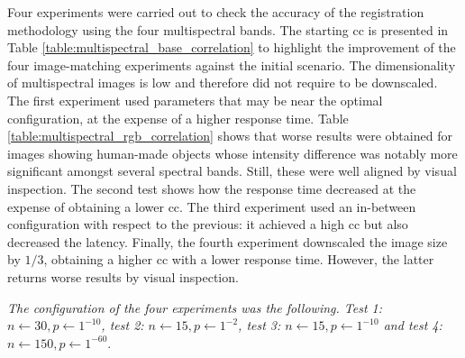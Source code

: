 Four experiments were carried out to check the accuracy of the registration methodology using the four multispectral bands. The starting \acrshort{cc} is presented in Table \ref{table:multispectral_base_correlation} to highlight the improvement of the four image-matching experiments against the initial scenario. The dimensionality of multispectral images is low and therefore did not require to be downscaled. The first experiment used parameters that may be near the optimal configuration, at the expense of a higher response time. Table \ref{table:multispectral_rgb_correlation} shows that worse results were obtained for images showing human-made objects whose intensity difference was notably more significant amongst several spectral bands. Still, these were well aligned by visual inspection. The second test shows how the response time decreased at the expense of obtaining a lower \acrshort{cc}. The third experiment used an in-between configuration with respect to the previous: it achieved a high \acrshort{cc} but also decreased the latency. Finally, the fourth experiment downscaled the image size by $1/3$, obtaining a higher \acrshort{cc} with a lower response time. However, the latter returns worse results by visual inspection.

\textit{The configuration of the four experiments was the following. Test 1: $n \gets 30, p \gets 1^{-10}$, test 2: $n \gets 15, p \gets 1^{-2}$, test 3: $n \gets 15, p \gets 1^{-10}$ and test 4: $n \gets 150, p \gets 1^{-60}$}.

